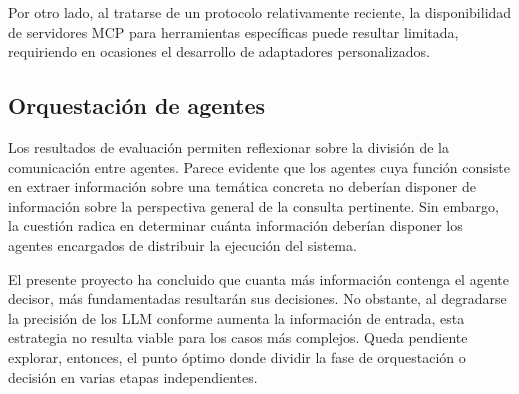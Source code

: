 Por otro lado, al tratarse de un protocolo relativamente reciente, la disponibilidad de servidores MCP para herramientas específicas puede resultar limitada, requiriendo en ocasiones el desarrollo de adaptadores personalizados. 

\subsection{Orquestación de agentes}
\label{sec:conc}
Los resultados de evaluación permiten reflexionar sobre la división de la comunicación entre agentes. Parece evidente que los agentes cuya función consiste en extraer información sobre una temática concreta no deberían disponer de información sobre la perspectiva general de la consulta pertinente. Sin embargo, la cuestión radica en determinar cuánta información deberían disponer los agentes encargados de distribuir la ejecución del sistema.

El presente proyecto ha concluido que cuanta más información contenga el agente decisor, más fundamentadas resultarán sus decisiones. No obstante, al degradarse la precisión de los LLM conforme aumenta la información de entrada, esta estrategia no resulta viable para los casos más complejos. Queda pendiente explorar, entonces, el punto óptimo donde dividir la fase de orquestación o decisión en varias etapas independientes.



